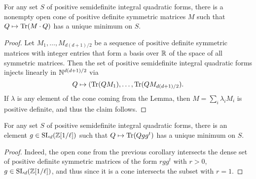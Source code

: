 \documentclass{amsart}
\begin{document}
\begin{corollary}
  For any set $S$ of positive semidefinite integral quadratic forms, there is a nonempty open cone of positive definite symmetric matrices $M$ such that $Q\mapsto \operatorname{Tr}(M\cdot Q)$ has a unique minimum on $S$.
\end{corollary}
\begin{proof}
  Let $M_1,\dots,M_{d(d+1)/2}$ be a sequence of positive definite symmetric matrices with integer entries that form a basis over $\mathbb{R}$ of the space of all symmetric matrices. Then the set of positive semidefinite integral quadratic forms injects linearly in $\mathbb{N}^{d(d+1)/2}$ via
  \[
    Q\mapsto (\operatorname{Tr}(Q M_1),\dots,\operatorname{Tr}(Q M_{d(d+1)/2}).
  \]
  If $\lambda$ is any element of the cone coming from the Lemma, then $M  = \sum_i \lambda_i M_i$ is positive definite, and thus the claim follows.
\end{proof}
%
%
%

\begin{corollary}
  For any set $S$ of positive semidefinite integral quadratic forms, there is an element $g \in \operatorname{SL}_d(\mathbb{Z}[1/\ell])$ such that $Q \mapsto \operatorname{Tr}(Q g g^t)$ has a unique minimum on $S$.
\end{corollary}
\begin{proof}
  Indeed, the open cone from the previous corollary intersects the dense set of positive definite symmetric matrices of the form $r g g^t$ with $r > 0$, $g \in \operatorname{SL}_d(\mathbb{Z}[1/\ell])$, and thus since it is a cone intersects the subset with $r = 1$.
\end{proof}
%
\end{document}
